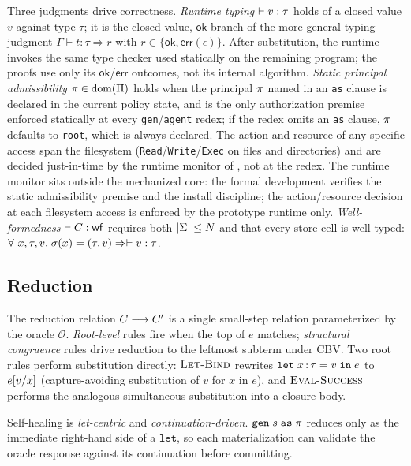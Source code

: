 Three judgments drive correctness. \emph{Runtime typing}
$\vdash v : \tau$ holds of a closed value $v$ against type $\tau$; it
is the closed-value, $\mathsf{ok}$ branch of the more general
typing judgment $\Gamma \vdash t : \tau \Rightarrow r$ with
$r \in \{\mathsf{ok}, \mathsf{err}(\epsilon)\}$. After substitution, the
runtime invokes the same type checker used statically on the remaining
program; the proofs use only its $\mathsf{ok}$/$\mathsf{err}$ outcomes,
not its internal algorithm. \emph{Static principal admissibility}
$\pi \in \mathrm{dom}(\Pi)$ holds when the principal $\pi$ named
in an \texttt{as} clause is declared in the current policy state, and
is the only authorization premise enforced statically at every
\texttt{gen}/\texttt{agent} redex; if the redex omits an \texttt{as}
clause, $\pi$ defaults to \texttt{root}, which is always declared.
The action and resource of any specific access span the filesystem
(\texttt{Read}/\texttt{Write}/\texttt{Exec} on files and directories)
and are decided just-in-time by the runtime monitor of
, not at the redex. The runtime monitor sits
outside the mechanized core: the formal development verifies the static admissibility
premise and the install discipline; the action/resource decision at
each filesystem access is enforced by the prototype runtime only.
\emph{Well-formedness} $\vdash C : \mathsf{wf}$ requires both $|\Sigma| \le N$ and
that every store cell is well-typed:
$\forall~x,\tau,v.\; \sigma(x) = (\tau, v) \Rightarrow \vdash v : \tau$.

\subsection{Reduction}
\label{sec:sem-reduction}

The reduction relation $C \longrightarrow C'$ is a single small-step relation
parameterized by the oracle $\mathcal{O}$. \emph{Root-level} rules fire
when the top of $e$ matches; \emph{structural congruence} rules drive
reduction to the leftmost subterm under CBV. Two root rules perform
substitution directly: $\textsc{Let-Bind}$ rewrites $\texttt{let}\; x\,{:}\,\tau = v\;\texttt{in}\;e$
to $e[v/x]$ (capture-avoiding substitution of $v$ for $x$ in $e$),
and $\textsc{Eval-Success}$ performs the analogous simultaneous
substitution into a closure body.

Self-healing is \emph{let-centric} and \emph{continuation-driven}.
$\texttt{gen}\;s\;\texttt{as}\;\pi$ reduces only as the immediate right-hand side of
a $\texttt{let}$, so each materialization can validate the oracle
response against its continuation before committing.

